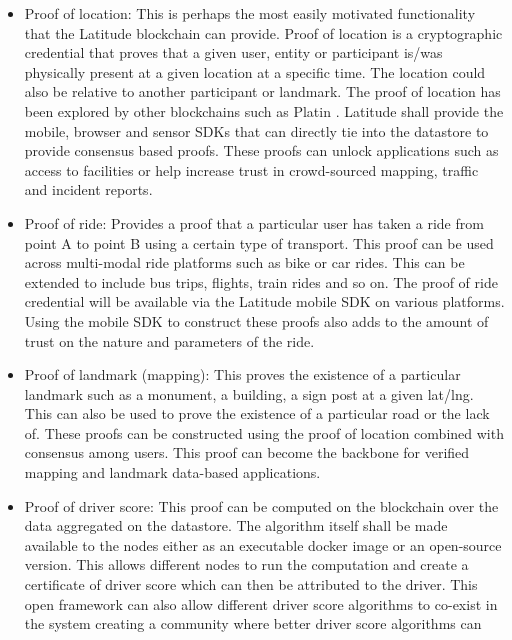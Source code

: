  \begin{itemize}
     \item Proof of location: This is perhaps the most easily motivated functionality that the Latitude blockchain can
         provide. Proof of location is a cryptographic credential that proves that a given user, entity or participant
         is/was physically present at a given location at a specific time. The location could also be relative to
         another participant or landmark. The proof of location
         has been explored by other blockchains such as Platin \cite{platin}. Latitude shall provide the mobile, browser
         and sensor SDKs that can directly tie into the datastore to provide consensus based proofs. These proofs can
         unlock applications such as access to facilities or help increase trust in crowd-sourced mapping, traffic and incident
         reports.
     \item Proof of ride: Provides a proof that a particular user has taken a ride from point A to point B using a
         certain type of transport. This proof can be used across multi-modal ride platforms such as bike or car rides.
         This can be extended to include bus trips, flights, train rides and so on. The proof of ride credential will be
         available via the Latitude mobile SDK on various platforms. Using the mobile SDK to construct these proofs also
         adds to the amount of trust on the nature and parameters of the ride.
     \item Proof of landmark (mapping): This proves the existence of a particular landmark such as a monument, a
         building, a sign post at a given lat/lng. This can also be used to prove the existence of a particular road or
         the lack of. These proofs can be constructed using the proof of location combined with consensus among users.
         This proof can become the backbone for verified mapping and landmark data-based applications.
     \item Proof of driver score: This proof can be computed on the blockchain over the data aggregated on the
         datastore. The algorithm itself shall be made available to the nodes either as an executable docker image or an
         open-source version. This allows different nodes to run the computation and create a certificate of 
         driver score which can then be attributed to the driver. This open framework can also allow different
         driver score algorithms to co-exist in the system creating a community where better driver score algorithms can

\end{itemize}

